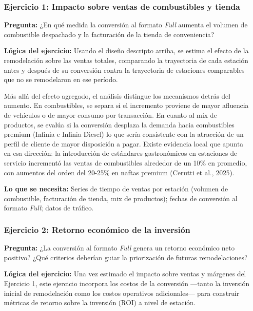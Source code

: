 \subsubsection*{Ejercicio 1: Impacto sobre ventas de combustibles y tienda}
\textbf{Pregunta:} ¿En qué medida la conversión al formato \emph{Full} aumenta el volumen de combustible despachado y la facturación de la tienda de conveniencia?

\textbf{Lógica del ejercicio:} Usando el diseño descripto arriba, se estima el efecto de la remodelación sobre las ventas totales, comparando la trayectoria de cada estación antes y después de su conversión contra la trayectoria de estaciones comparables que no se remodelaron en ese período.

Más allá del efecto agregado, el análisis distingue los mecanismos detrás del aumento. En combustibles, se separa si el incremento proviene de mayor afluencia de vehículos o de mayor consumo por transacción. En cuanto al mix de productos, se evalúa si la conversión desplaza la demanda hacia combustibles premium (Infinia e Infinia Diesel)  lo que sería consistente con la atracción de un perfil de cliente de mayor disposición a pagar. Existe evidencia local que apunta en esa dirección: la introducción de estándares gastronómicos en estaciones de servicio incrementó las ventas de combustibles alrededor de un 10\% en promedio, con aumentos del orden del 20-25\% en naftas premium (Cerutti et al., 2025).


\textbf{Lo que se necesita:} Series de tiempo de ventas por estación (volumen de combustible, facturación de tienda, mix de productos); fechas de conversión al formato \emph{Full}; datos de tráfico.

\subsubsection*{Ejercicio 2: Retorno económico de la inversión}

\textbf{Pregunta:} ¿La conversión al formato \emph{Full} genera un retorno económico neto positivo? ¿Qué criterios deberían guiar la priorización de futuras remodelaciones?

\textbf{Lógica del ejercicio:} Una vez estimado el impacto sobre ventas y márgenes del Ejercicio 1, este ejercicio incorpora los costos de la conversión —tanto la inversión inicial de remodelación como los costos operativos adicionales— para construir métricas de retorno sobre la inversión (ROI) a nivel de estación.

